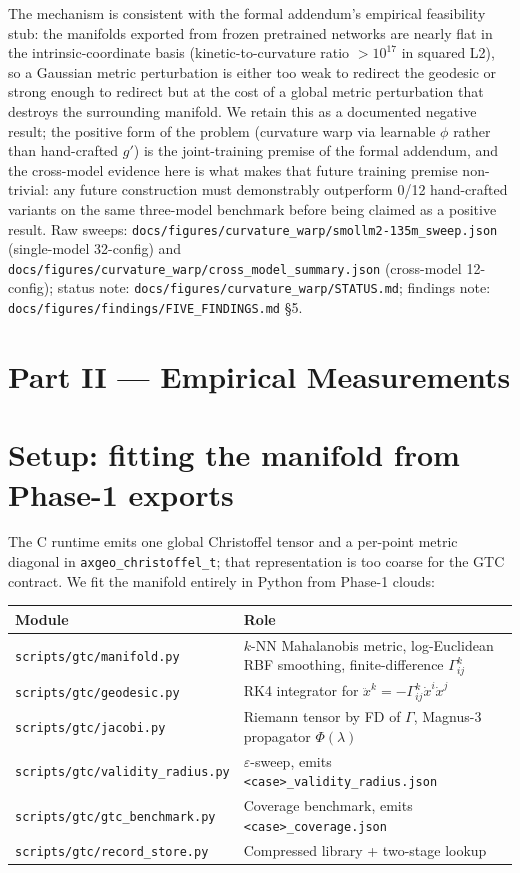 \documentclass[11pt]{article}
\begin{document}
The mechanism is consistent with the formal addendum's empirical feasibility stub: the manifolds
exported from frozen pretrained networks are nearly flat in the
intrinsic-coordinate basis (kinetic-to-curvature ratio $> 10^{17}$
in squared L2), so a Gaussian metric perturbation is either too weak
to redirect the geodesic or strong enough to redirect but at the cost
of a global metric perturbation that destroys the surrounding
manifold. We retain this as a documented negative result; the positive
form of the problem (curvature warp via learnable $\phi$ rather
than hand-crafted $g'$) is the joint-training premise of the formal addendum, and the cross-model evidence here is what
makes that future training premise non-trivial: any future
construction must demonstrably outperform 0/12 hand-crafted variants
on the same three-model benchmark before being claimed as a positive
result. Raw sweeps:
\texttt{docs/figures/curvature\_warp/smollm2-135m\_sweep.json}
(single-model 32-config) and
\texttt{docs/figures/curvature\_warp/cross\_model\_summary.json}
(cross-model 12-config); status note:
\texttt{docs/figures/curvature\_warp/STATUS.md};
findings note:
\texttt{docs/figures/findings/FIVE\_FINDINGS.md} \S5.

\section*{Part II --- Empirical Measurements}

\section{Setup: fitting the manifold from Phase-1 exports}
\label{sec:setup}

The C runtime emits one global Christoffel tensor and a per-point metric
diagonal in \texttt{axgeo\_christoffel\_t}; that representation is too coarse
for the GTC contract. We fit the manifold entirely in Python from Phase-1
clouds:

\begin{center}\small
\begin{tabularx}{\linewidth}{lX}
\toprule
Module & Role\\
\midrule
\texttt{scripts/gtc/manifold.py}      & $k$-NN Mahalanobis metric, log-Euclidean RBF smoothing, finite-difference $\Gamma^k_{ij}$\\
\texttt{scripts/gtc/geodesic.py}      & RK4 integrator for $\ddot x^k = -\Gamma^k_{ij}\dot x^i \dot x^j$\\
\texttt{scripts/gtc/jacobi.py}        & Riemann tensor by FD of $\Gamma$, Magnus-3 propagator $\Phi(\lambda)$\\
\texttt{scripts/gtc/validity\_radius.py} & $\varepsilon$-sweep, emits \texttt{<case>\_validity\_radius.json}\\
\texttt{scripts/gtc/gtc\_benchmark.py} & Coverage benchmark, emits \texttt{<case>\_coverage.json}\\
\texttt{scripts/gtc/record\_store.py} & Compressed library + two-stage lookup\\
\bottomrule
\end{tabularx}
\end{center}
\end{document}
